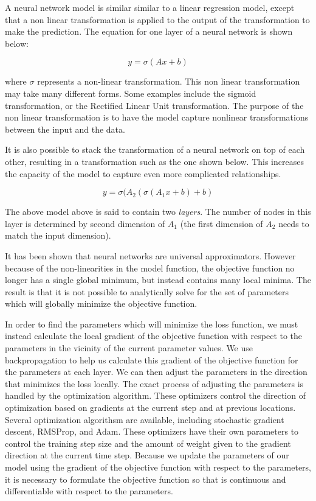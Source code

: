 A neural network model\cite{Schmidhuber_NN_Overview} is similar similar to a linear regression model, except that a non linear transformation is applied to the output of the transformation to make the prediction. The equation for one layer of a neural network is shown below:

\begin{equation}
y = \sigma( Ax + b)
\end{equation}

where $\sigma$ represents a non-linear transformation. This non linear transformation may take many different forms. Some examples include the sigmoid transformation, or the Rectified Linear Unit transformation\cite{Nair2010ReLU,lecun_efficient_backprop}. The purpose of the non linear transformation is to have the model capture nonlinear transformations between the input and the data.

It is also possible to stack the transformation of a neural network on top of each other, resulting in a transformation such as the one shown below. This increases the capacity of the model to capture even more complicated relationships. 

\begin{equation}
y = \sigma( A_2 ( \sigma(A_1 x + b) + b)
\end{equation}

The above model above is said to contain two \textit{layers}. The number of nodes in this layer is determined by second dimension of $A_1$ (the first dimension of $A_2$ needs to match the input dimension).

It has been shown that neural networks are universal approximators\cite{Kolmogorov:57,hornik1989}. However because of the non-linearities in the model function, the objective function no longer has a single global minimum, but instead contains many local minima. The result is that it is not possible to analytically solve for the set of parameters which will globally minimize the objective function.

In order to find the parameters which will minimize the loss function, we must instead calculate the local gradient of the objective function with respect to the parameters in the vicinity of the current parameter values. We use backpropagation\cite{lecun_efficient_backprop} to help us calculate this gradient of the objective function for the parameters at each layer. We can then adjust the parameters in the direction that minimizes the loss locally. 
The exact process of adjusting the parameters is handled by the optimization algorithm. These optimizers control the direction of optimization based on gradients at the current step and at previous locations. Several optimization algorithsm are available, including stochastic gradient descent, RMSProp\cite{Tieleman2012}, and Adam\cite{Kingma_adam_optimizer}. 
These optimizers have their own parameters to control the training step size and the amount of weight given to the gradient direction at the current time step. 
Because we update the parameters of our model using the gradient of the objective function with respect to the parameters, it is necessary to formulate the objective function so that is continuous and differentiable with respect to the parameters.

